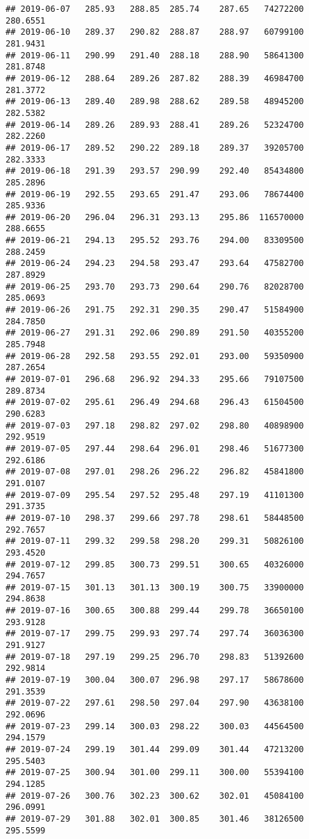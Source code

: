 \documentclass[
]{article}
\begin{document}
\begin{verbatim}
## 2019-06-07   285.93   288.85  285.74    287.65   74272200     280.6551
## 2019-06-10   289.37   290.82  288.87    288.97   60799100     281.9431
## 2019-06-11   290.99   291.40  288.18    288.90   58641300     281.8748
## 2019-06-12   288.64   289.26  287.82    288.39   46984700     281.3772
## 2019-06-13   289.40   289.98  288.62    289.58   48945200     282.5382
## 2019-06-14   289.26   289.93  288.41    289.26   52324700     282.2260
## 2019-06-17   289.52   290.22  289.18    289.37   39205700     282.3333
## 2019-06-18   291.39   293.57  290.99    292.40   85434800     285.2896
## 2019-06-19   292.55   293.65  291.47    293.06   78674400     285.9336
## 2019-06-20   296.04   296.31  293.13    295.86  116570000     288.6655
## 2019-06-21   294.13   295.52  293.76    294.00   83309500     288.2459
## 2019-06-24   294.23   294.58  293.47    293.64   47582700     287.8929
## 2019-06-25   293.70   293.73  290.64    290.76   82028700     285.0693
## 2019-06-26   291.75   292.31  290.35    290.47   51584900     284.7850
## 2019-06-27   291.31   292.06  290.89    291.50   40355200     285.7948
## 2019-06-28   292.58   293.55  292.01    293.00   59350900     287.2654
## 2019-07-01   296.68   296.92  294.33    295.66   79107500     289.8734
## 2019-07-02   295.61   296.49  294.68    296.43   61504500     290.6283
## 2019-07-03   297.18   298.82  297.02    298.80   40898900     292.9519
## 2019-07-05   297.44   298.64  296.01    298.46   51677300     292.6186
## 2019-07-08   297.01   298.26  296.22    296.82   45841800     291.0107
## 2019-07-09   295.54   297.52  295.48    297.19   41101300     291.3735
## 2019-07-10   298.37   299.66  297.78    298.61   58448500     292.7657
## 2019-07-11   299.32   299.58  298.20    299.31   50826100     293.4520
## 2019-07-12   299.85   300.73  299.51    300.65   40326000     294.7657
## 2019-07-15   301.13   301.13  300.19    300.75   33900000     294.8638
## 2019-07-16   300.65   300.88  299.44    299.78   36650100     293.9128
## 2019-07-17   299.75   299.93  297.74    297.74   36036300     291.9127
## 2019-07-18   297.19   299.25  296.70    298.83   51392600     292.9814
## 2019-07-19   300.04   300.07  296.98    297.17   58678600     291.3539
## 2019-07-22   297.61   298.50  297.04    297.90   43638100     292.0696
## 2019-07-23   299.14   300.03  298.22    300.03   44564500     294.1579
## 2019-07-24   299.19   301.44  299.09    301.44   47213200     295.5403
## 2019-07-25   300.94   301.00  299.11    300.00   55394100     294.1285
## 2019-07-26   300.76   302.23  300.62    302.01   45084100     296.0991
## 2019-07-29   301.88   302.01  300.85    301.46   38126500     295.5599

\end{verbatim}
\end{document}
